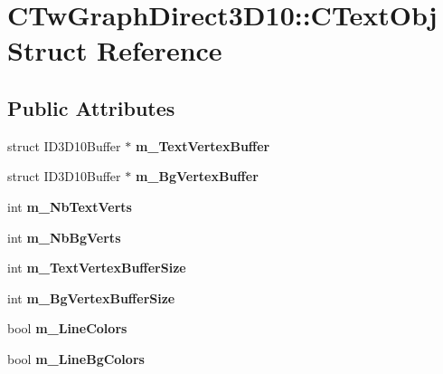 \hypertarget{struct_c_tw_graph_direct3_d10_1_1_c_text_obj}{\section{C\+Tw\+Graph\+Direct3\+D10\+:\+:C\+Text\+Obj Struct Reference}
\label{struct_c_tw_graph_direct3_d10_1_1_c_text_obj}
}
\subsection*{Public Attributes}
\begin{DoxyCompactItemize}
\item 
\hypertarget{struct_c_tw_graph_direct3_d10_1_1_c_text_obj_a9640b9f492f5cd996f154ef811d97876}{struct I\+D3\+D10\+Buffer $\ast$ {\bfseries m\+\_\+\+Text\+Vertex\+Buffer}}\label{struct_c_tw_graph_direct3_d10_1_1_c_text_obj_a9640b9f492f5cd996f154ef811d97876}

\item 
\hypertarget{struct_c_tw_graph_direct3_d10_1_1_c_text_obj_ad426bd5c75ce5f3fbabe7a7a02cec803}{struct I\+D3\+D10\+Buffer $\ast$ {\bfseries m\+\_\+\+Bg\+Vertex\+Buffer}}\label{struct_c_tw_graph_direct3_d10_1_1_c_text_obj_ad426bd5c75ce5f3fbabe7a7a02cec803}

\item 
\hypertarget{struct_c_tw_graph_direct3_d10_1_1_c_text_obj_ae12ec07e731da51bd89e76a1cd9f456c}{int {\bfseries m\+\_\+\+Nb\+Text\+Verts}}\label{struct_c_tw_graph_direct3_d10_1_1_c_text_obj_ae12ec07e731da51bd89e76a1cd9f456c}

\item 
\hypertarget{struct_c_tw_graph_direct3_d10_1_1_c_text_obj_a369c36fec5da9ae73590e07ba61413d2}{int {\bfseries m\+\_\+\+Nb\+Bg\+Verts}}\label{struct_c_tw_graph_direct3_d10_1_1_c_text_obj_a369c36fec5da9ae73590e07ba61413d2}

\item 
\hypertarget{struct_c_tw_graph_direct3_d10_1_1_c_text_obj_afa19124f9b66b564b733a9d6f4e11ee7}{int {\bfseries m\+\_\+\+Text\+Vertex\+Buffer\+Size}}\label{struct_c_tw_graph_direct3_d10_1_1_c_text_obj_afa19124f9b66b564b733a9d6f4e11ee7}

\item 
\hypertarget{struct_c_tw_graph_direct3_d10_1_1_c_text_obj_addf6ee1fc9ca4169288b992faa4beefc}{int {\bfseries m\+\_\+\+Bg\+Vertex\+Buffer\+Size}}\label{struct_c_tw_graph_direct3_d10_1_1_c_text_obj_addf6ee1fc9ca4169288b992faa4beefc}

\item 
\hypertarget{struct_c_tw_graph_direct3_d10_1_1_c_text_obj_ac642e3f3679238f2d52e7f4b5b67dde9}{bool {\bfseries m\+\_\+\+Line\+Colors}}\label{struct_c_tw_graph_direct3_d10_1_1_c_text_obj_ac642e3f3679238f2d52e7f4b5b67dde9}

\item 
\hypertarget{struct_c_tw_graph_direct3_d10_1_1_c_text_obj_a1debf64bb05a16d3e7f7410aa918ff9c}{bool {\bfseries m\+\_\+\+Line\+Bg\+Colors}}\label{struct_c_tw_graph_direct3_d10_1_1_c_text_obj_a1debf64bb05a16d3e7f7410aa918ff9c}

\end{DoxyCompactItemize}


